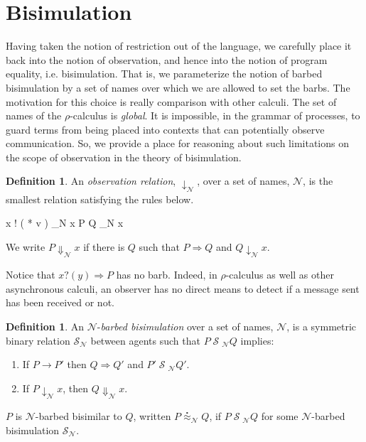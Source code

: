 \documentclass[]{amsart}
\newcommand{\id}[1]{\texttt{#1}}
\newcommand{\juxtap}{\mathbin{\id{|}}}
\newcommand{\concat}{\Rightarrow}
\newcommand{\nameeq}{\mathbin{\equiv_N}}
\newcommand{\binpar}[2]{#1 \juxtap #2}
\newcommand{\outputp}[2]{#1 ! ( * #2 )}
\newcommand{\prefix}[3]{#1 ? ( #2 ) \concat #3}
\newcommand{\red}{\rightarrow}
\newcommand{\wred}{\Rightarrow}
\newcommand{\rel}[1]{\;{\mathcal #1}\;} %
\newcommand{\wbbisim}{\stackrel{\centerdot}{\approx}} %
\theoremstyle{definition}
\newtheorem{defn}[thm]{Definition}
\theoremstyle{remark}
\numberwithin{equation}{subsection}
\newcommand{\pic}{$\pi$-calculus}
\newcommand{\rhoc}{$\rho$-calculus}
\begin{document}
\section{Bisimulation}

Having taken the notion of restriction out of the language, we
carefully place it back into the notion of observation, and hence into
the notion of program equality, i.e. bisimulation. That is, we
parameterize the notion of barbed bisimulation by a set of names over
which we are allowed to set the barbs. The motivation for this choice
is really comparison with other calculi. The set of names of the
{\rhoc} is \textit{global}. It is impossible, in the grammar of
processes, to guard terms from being placed into contexts that can
potentially observe communication. So, we provide a place for
reasoning about such limitations on the scope of observation in the
theory of bisimulation.


\begin{defn}
An \emph{observation relation}, $\downarrow_{\mathcal N}$, over a set
of names, $\mathcal N$, is the smallest relation satisfying the rules
below.

\infrule[Out-barb]{y \in {\mathcal N}, \; x \nameeq y}
		  {\outputp{x}{v} \downarrow_{\mathcal N} x}
		  {\binpar{P}{Q} \downarrow_{\mathcal N} x}

We write $P \Downarrow_{\mathcal N} x$ if there is $Q$ such that 
$P \wred Q$ and $Q \downarrow_{\mathcal N} x$.
\end{defn}

Notice that $\prefix{x}{y}{P}$ has no barb.  Indeed, in {\rhoc} as well
as other asynchronous calculi, an observer has no direct means to
detect if a message sent has been received or not.

\begin{defn}
An  ${\mathcal N}$-\emph{barbed bisimulation} over a set of names, ${\mathcal N}$, is a symmetric binary relation 
${\mathcal S}_{\mathcal N}$ between agents such that $P\rel{S}_{\mathcal N}Q$ implies:
\begin{enumerate}
\item If $P \red P'$ then $Q \wred Q'$ and $P'\rel{S}_{\mathcal N} Q'$.
\item If $P\downarrow_{\mathcal N} x$, then $Q\Downarrow_{\mathcal N} x$.
\end{enumerate}
$P$ is ${\mathcal N}$-barbed bisimilar to $Q$, written
$P \wbbisim_{\mathcal N} Q$, if $P \rel{S}_{\mathcal N} Q$ for some ${\mathcal N}$-barbed bisimulation ${\mathcal S}_{\mathcal N}$.
\end{defn}
\end{document}
